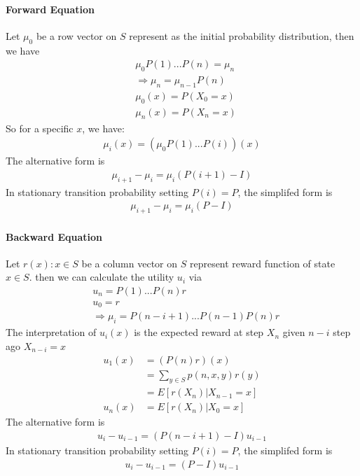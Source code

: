 \paragraph{Forward Equation} Let $\mu_0$ be a row vector on $S$ represent as the initial probability distribution, then we have 
    \begin{align*}
        & \mu_0 P(1)...P(n) = \mu_n \\
        & \Longrightarrow \mu_n = \mu_{n-1}P(n) \tag{Forward Equation} \\
        & \mu_0(x) = P(X_0 = x) \\
        & \mu_n(x) = P(X_n = x)
    \end{align*}
So for a specific $x$, we have: 
    \begin{align*}
        \mu_i(x) = (\mu_0 P(1)...P(i))(x) 
    \end{align*}
The alternative form is 
    \begin{align*}
        \mu_{i+1} - \mu_i = \mu_i(P(i+1)-I)
    \end{align*}
In stationary transition probability setting $P(i) = P$, the simplifed form is 
    \begin{align*}
        \mu_{i+1} - \mu_i = \mu_i(P-I)
    \end{align*}

\paragraph{Backward Equation} Let $r(x):x\in S$ be a column vector on $S$ represent  reward function of state $x\in S$. then we can calculate the utility $u_i$ via 
    \begin{align*}
        & u_n = P(1)...P(n)r \\
        & u_0 = r \\
        & \Longrightarrow \mu_i = P(n-i+1) ... P(n-1) P(n) r \tag{Backward Equation}
    \end{align*}
The interpretation of $u_i(x)$ is the expected reward at step $X_n$ given $n-i$ step ago $X_{n-i}=x$
    \begin{align*}
        u_1(x)
        & = (P(n)r)(x)\\
        & = \sum_{y\in S} p(n, x, y) r(y)\\
        & = E[r(X_n)|X_{n-1}=x]\\
        u_n(x) 
        & = E[r(X_n)|X_0 = x]
    \end{align*}
The alternative form is 
    \begin{align*}
        u_i - u_{i-1} = (P(n-i+1) - I)u_{i-1}
    \end{align*}
In stationary transition probability setting $P(i) = P$, the simplifed form is 
    \begin{align*}
        u_i - u_{i-1} = (P - I)u_{i-1}
    \end{align*}

